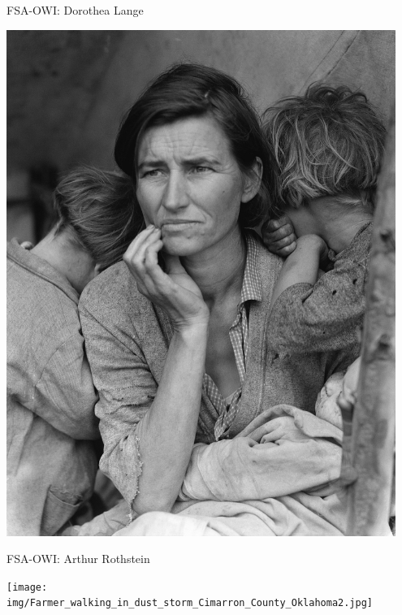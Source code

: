 \documentclass[12pt,ignorenonframetext,aspectratio=169]{beamer}
\begin{document}
\begin{frame}{FSA-OWI: Dorothea Lange}

\begin{center}
\includegraphics[width=0.95\textwidth]{img/1280px-Lange-MigrantMother02.jpg}
\end{center}

\end{frame}

\begin{frame}{FSA-OWI: Arthur Rothstein}

\begin{center}
\texttt{[image: img/Farmer\_walking\_in\_dust\_storm\_Cimarron\_County\_Oklahoma2.jpg]}
\end{center}

\end{frame}
\end{document}
